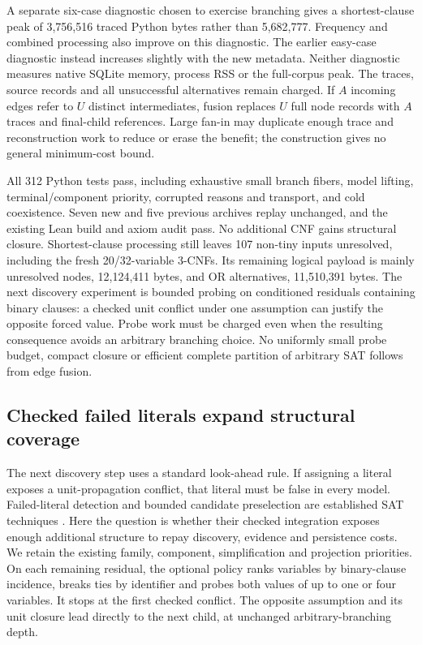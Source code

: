 \documentclass[11pt,a4paper]{article}
\numberwithin{equation}{section}
\theoremstyle{plain}
\theoremstyle{definition}
\theoremstyle{remark}
\begin{document}
A separate six-case diagnostic chosen to exercise branching gives a shortest-clause peak of 3,756,516 traced Python bytes rather than 5,682,777. Frequency and combined processing also improve on this diagnostic. The earlier easy-case diagnostic instead increases slightly with the new metadata. Neither diagnostic measures native SQLite memory, process RSS or the full-corpus peak. The traces, source records and all unsuccessful alternatives remain charged. If $A$ incoming edges refer to $U$ distinct intermediates, fusion replaces $U$ full node records with $A$ traces and final-child references. Large fan-in may duplicate enough trace and reconstruction work to reduce or erase the benefit; the construction gives no general minimum-cost bound.

All 312 Python tests pass, including exhaustive small branch fibers, model lifting, terminal/component priority, corrupted reasons and transport, and cold coexistence. Seven new and five previous archives replay unchanged, and the existing Lean build and axiom audit pass. No additional CNF gains structural closure. Shortest-clause processing still leaves 107 non-tiny inputs unresolved, including the fresh 20/32-variable 3-CNFs. Its remaining logical payload is mainly unresolved nodes, 12,124,411 bytes, and OR alternatives, 11,510,391 bytes. The next discovery experiment is bounded probing on conditioned residuals containing binary clauses: a checked unit conflict under one assumption can justify the opposite forced value. Probe work must be charged even when the resulting consequence avoids an arbitrary branching choice. No uniformly small probe budget, compact closure or efficient complete partition of arbitrary SAT follows from edge fusion.

\subsection{Checked failed literals expand structural coverage}
\label{sec:checked-failed-literals}

The next discovery step uses a standard look-ahead rule. If assigning a literal exposes a unit-propagation conflict, that literal must be false in every model. Failed-literal detection and bounded candidate preselection are established SAT techniques \citep{heule2006march}. Here the question is whether their checked integration exposes enough additional structure to repay discovery, evidence and persistence costs. We retain the existing family, component, simplification and projection priorities. On each remaining residual, the optional policy ranks variables by binary-clause incidence, breaks ties by identifier and probes both values of up to one or four variables. It stops at the first checked conflict. The opposite assumption and its unit closure lead directly to the next child, at unchanged arbitrary-branching depth.
\end{document}
